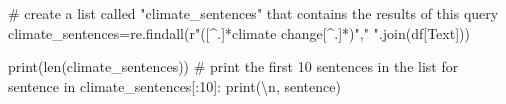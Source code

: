 \documentclass[
  letterpaper,
  DIV=11,
  numbers=noendperiod]{scrreprt}
\newenvironment{Shaded}{\begin{snugshade}}{\end{snugshade}}
\newcommand{\BuiltInTok}[1]{\textcolor[rgb]{0.00,0.23,0.31}{#1}}
\newcommand{\CharTok}[1]{\textcolor[rgb]{0.13,0.47,0.30}{#1}}
\newcommand{\CommentTok}[1]{\textcolor[rgb]{0.37,0.37,0.37}{#1}}
\newcommand{\ControlFlowTok}[1]{\textcolor[rgb]{0.00,0.23,0.31}{#1}}
\newcommand{\DecValTok}[1]{\textcolor[rgb]{0.68,0.00,0.00}{#1}}
\newcommand{\KeywordTok}[1]{\textcolor[rgb]{0.00,0.23,0.31}{#1}}
\newcommand{\NormalTok}[1]{\textcolor[rgb]{0.00,0.23,0.31}{#1}}
\newcommand{\OperatorTok}[1]{\textcolor[rgb]{0.37,0.37,0.37}{#1}}
\newcommand{\StringTok}[1]{\textcolor[rgb]{0.13,0.47,0.30}{#1}}
\newcommand{\VerbatimStringTok}[1]{\textcolor[rgb]{0.13,0.47,0.30}{#1}}
\begin{document}
\begin{Shaded}
\begin{Highlighting}[]
\CommentTok{\# create a list called "climate\_sentences" that contains the results of this query}
\NormalTok{climate\_sentences}\OperatorTok{=}\NormalTok{re.findall(}\VerbatimStringTok{r"([\^{}.]*climate change[\^{}.]*)"}\NormalTok{,}\StringTok{" "}\NormalTok{.join(df[}\StringTok{\textquotesingle{}Text\textquotesingle{}}\NormalTok{]))}

\BuiltInTok{print}\NormalTok{(}\BuiltInTok{len}\NormalTok{(climate\_sentences))}
\CommentTok{\# print the first 10 sentences in the list}
\ControlFlowTok{for}\NormalTok{ sentence }\KeywordTok{in}\NormalTok{ climate\_sentences[:}\DecValTok{10}\NormalTok{]:}
  \BuiltInTok{print}\NormalTok{(}\StringTok{\textquotesingle{}}\CharTok{\textbackslash{}n}\StringTok{\textquotesingle{}}\NormalTok{, sentence)}
\end{Highlighting}
\end{Shaded}
\end{document}
